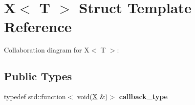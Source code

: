 \hypertarget{class_x}{}\section{X$<$ T $>$ Struct Template Reference}
\label{class_x}


Collaboration diagram for X$<$ T $>$\+:
\subsection*{Public Types}
\begin{DoxyCompactItemize}
\item 
\mbox{\label{class_x_afbdcd062cf163477fc42289834f63db9}} 
typedef std\+::function$<$ void(\mbox{\hyperlink{class_x}{X}} \&)$>$ {\bfseries callback\+\_\+type}
\end{DoxyCompactItemize}
